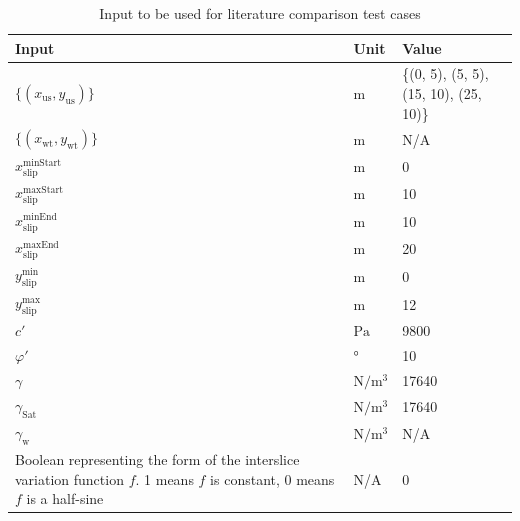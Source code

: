 \documentclass[12pt, titlepage]{article}
\begin{document}
\begin{table}[h!]
\renewcommand{\arraystretch}{1.5}
\begin{tabularx}{1.0\textwidth}{p{7cm} l X}
	\toprule \textbf{Input} &
	\textbf{Unit} & \textbf{Value}\\ \midrule
	$\{\left(x_\text{us},y_\text{us}\right)\}$ & $\text{m}$ & \{(0, 5), 
	(5, 5), (15, 10), (25, 10)\}\\
	$\{\left(x_\text{wt},y_\text{wt}\right)\}$ & $\text{m}$ & N/A\\
	${x_\text{slip}^\text{minStart}}$ & $\text{m}$ & 0\\
	${x_\text{slip}^\text{maxStart}}$ & $\text{m}$ & 10\\
	${x_\text{slip}^\text{minEnd}}$ & $\text{m}$ & 10\\
	${x_\text{slip}^\text{maxEnd}}$ & $\text{m}$ & 20\\
	${y_\text{slip}^\text{min}}$ & $\text{m}$ & 0\\
	${y_\text{slip}^\text{max}}$ & $\text{m}$ & 12\\
	$c'$ & $\si{\pascal}$ & 9800 \\
	$\varphi'$ & \si{\degree} & 10\\
	$\gamma$ & $\si{\newton\per\meter\cubed}$ & 17640 \\
	$\gamma_{\text{Sat}}$ & $\si{\newton\per\meter\cubed}$ & 17640 \\
	$\gamma_{\text{w}}$ & $\si{\newton\per\meter\cubed}$ & N/A \\
	Boolean representing the form of the interslice variation function $f$. 
	1 means $f$ is constant, 0 means $f$ is a half-sine & N/A & 0\\ 
	\bottomrule
\end{tabularx}
\caption{Input to be used for literature comparison test cases}
\label{Ex1Input}
\end{table}
\end{document}
